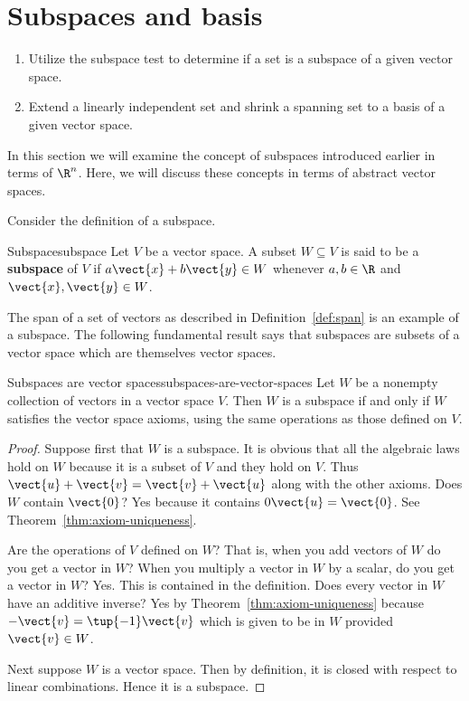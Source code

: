 \section{Subspaces and basis}

\begin{outcome}
  \begin{enumerate}
  \item Utilize the subspace test to determine if a set is a subspace
    of a given vector space.
  \item Extend a linearly independent set and shrink a spanning set to
    a basis of a given vector space.
  \end{enumerate}
\end{outcome}

In this section we will examine the concept of subspaces introduced earlier in terms of $\R^n$. Here, we will discuss these concepts in terms of abstract vector spaces. 

Consider the definition of a subspace.

\begin{definition}{Subspace}{subspace}
Let $V$ be a vector space. A subset $W\subseteq V$ is said to be a \textbf{subspace} of $V$ if $a\vect{x}+b\vect{y}
\in W$ whenever $a,b\in \R$ and $\vect{x},\vect{y}\in W$.
\end{definition}

The span of a set of vectors as described in Definition~\ref{def:span} is an example of a subspace. The following fundamental result says that subspaces are subsets of a
vector space which are themselves vector spaces.

\begin{theorem}{Subspaces are vector spaces}{subspaces-are-vector-spaces}
Let $W$ be a nonempty collection of vectors in a vector space $V$. Then $W$
is a subspace if and only if $W$ satisfies the vector space axioms, using the same
operations as those defined on $V$.
\end{theorem}

\begin{proof}
Suppose first that $W$ is a subspace. It is obvious that
all the algebraic laws hold on $W$ because it is a subset of $V$ and they
hold on $V$. Thus $\vect{u}+\vect{v}=\vect{v}+\vect{u}$ along with the other axioms. Does $W$
contain $\vect{0}$? Yes because it contains $0\vect{u}=\vect{0}$. See
Theorem~\ref{thm:axiom-uniqueness}.

 Are the operations of $V$ defined on $W$? That is,
when you add vectors of $W$ do you get a vector in $W$? When you multiply a
vector in $W$ by a scalar, do you get a vector in $W$? Yes. This is
contained in the definition. Does every vector in $W$ have an additive
inverse? Yes by Theorem~\ref{thm:axiom-uniqueness} because $-\vect{v}=\tup{
-1} \vect{v}$ which is given to be in $W$ provided $\vect{v}\in W$.

Next suppose $W$ is a vector space. Then by definition, it is closed with
respect to linear combinations. Hence it is a subspace. 
\end{proof}

